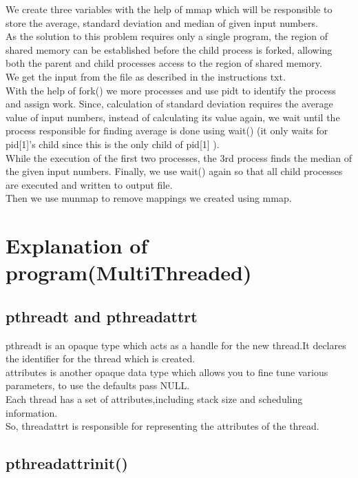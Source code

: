 \documentclass[12pt]{article}
\begin{document}
We create three variables with the help of mmap which will be responsible to store the average, standard deviation and median of given input numbers.\\
As the solution to this problem requires only a single program, the region of shared memory can be established before the child process is forked, allowing both the parent and child processes access to the region of shared memory.\\
We get the input from the file as described in the instructions txt.\\
With the help of fork() we more processes and use pid\textunderscore t to identify the process and assign work.
Since, calculation of standard deviation requires the average value of input numbers, instead of calculating its value again, we wait until the process responsible for finding average is done using wait() (it only waits for pid[1]'s child since this is the only child of pid[1]  ).\\
While the execution of the first two processes, the 3rd process finds the median of the given input numbers.
Finally, we use wait() again so that all child processes are executed and written to output file.\\
Then we use munmap to remove mappings we created using mmap.\\

\section{Explanation of program(MultiThreaded)}

\subsection{pthread\textunderscore t and pthread\textunderscore attr\textunderscore t}
pthread\textunderscore t is an opaque type which acts as a handle for the new thread.It declares the identifier for the thread which is created.\\
attributes is another opaque data type which allows you to fine tune various parameters, to use the defaults pass NULL.\\
Each thread has a set of attributes,including stack size and scheduling information.\\
So, thread\textunderscore attr\textunderscore t is responsible for representing the attributes of the thread.

\subsection{pthread\textunderscore attr\textunderscore init()}
\end{document}
